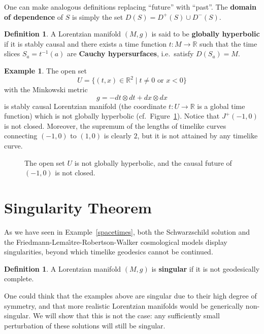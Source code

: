 \documentclass[12pt]{amsart}
\newcommand{\bbR}{\mathbb{R}}      %
\theoremstyle{definition}
\newtheorem{Def}[Thm]{Definition}
\newtheorem{Example}[Thm]{Example}
\theoremstyle{remark}
\begin{document}
One can make analogous definitions replacing ``future'' with ``past''. The {\bf domain of dependence} of $S$ is simply the set $D(S)=D^+(S)\cup D^-(S)$.

\begin{Def}
A Lorentzian manifold $(M,g)$ is said to be {\bf globally hyperbolic} if it is stably causal and there exists a time function $t:M \to \bbR$ such that the time slices $S_a = t^{-1}(a)$ are {\bf Cauchy hypersurfaces}, i.e.~satisfy $D(S_a)=M$.
\end{Def}

\begin{Example} \label{not_global_hyp}
The open set
\[
U = \{ (t,x) \in \bbR^2 \mid t \neq 0 \text{ or } x < 0 \}
\]
with the Minkowski metric
\[
g = - dt \otimes dt + dx \otimes dx
\]
is stably causal Lorentzian manifold (the coordinate $t:U \to \bbR$ is a global time function) which is not globally hyperbolic (cf.~Figure~\ref{Figure_not_gh}). Notice that $J^+(-1,0)$ is not closed. Moreover, the supremum of the lengths of timelike curves connecting $(-1,0)$ to $(1,0)$ is clearly $2$, but it is not attained by any timelike curve.
\end{Example}

\begin{figure}[h!]
\begin{center}
\textwidth
\leavevmode
{}
\end{center}
\caption{The open set $U$ is not globally hyperbolic, and the causal future of $(-1,0)$ is not closed.} \label{Figure_not_gh}
\end{figure}

%
%
%
\section{Singularity Theorem}
%
As we have seen in Example~\ref{spacetimes}, both the Schwarzschild solution and the Friedmann-Lema\^\i tre-Robertson-Walker cosmological models display singularities, beyond which timelike geodesics cannot be continued.

\begin{Def}
A Lorentzian manifold $(M,g)$ is {\bf singular} if it is not geodesically complete.
\end{Def}

One could think that the examples above are singular due to their high degree of symmetry, and that more realistic Lorentzian manifolds would be generically non-singular. We will show that this is not the case: any sufficiently small perturbation of these solutions will still be singular.
\end{document}
